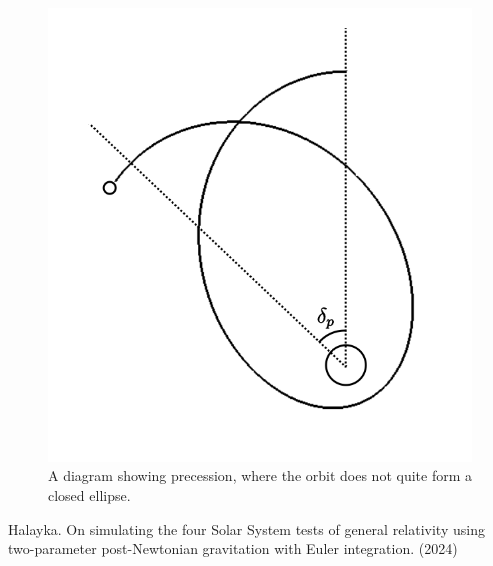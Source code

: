 \documentclass[12pt]{article}
\begin{document}
\begin{figure} 
\centering
\label{fig4}
  \includegraphics[width = 4 in]{precession.png}
  \caption{ A diagram showing precession, where the orbit does not quite form a closed ellipse.
}
\end{figure}



\begin{thebibliography}{9}


 Halayka. On simulating the four Solar System tests of general relativity using two-parameter post-Newtonian gravitation with Euler integration. (2024)

\end{thebibliography}
\end{document}
